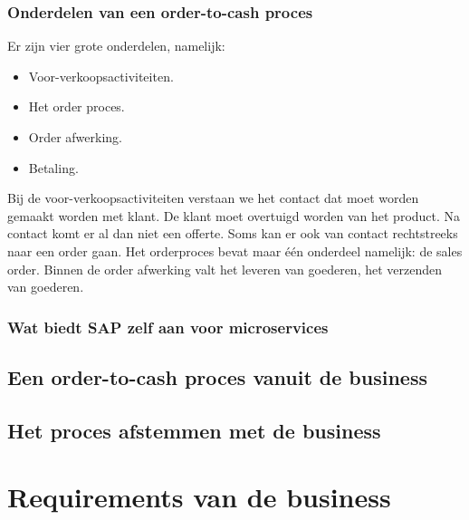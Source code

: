\subsubsection{Onderdelen van een order-to-cash proces}
Er zijn vier grote onderdelen, namelijk:
\begin{itemize}
	\item Voor-verkoopsactiviteiten.
	\item Het order proces.
	\item Order afwerking.
	\item Betaling.
\end{itemize}
Bij de voor-verkoopsactiviteiten verstaan we het contact dat moet worden gemaakt worden met klant. De klant moet overtuigd worden van het product. Na contact komt er al dan niet een offerte. Soms kan er ook van contact rechtstreeks naar een order gaan. 
Het orderproces bevat maar één onderdeel namelijk: de sales order. 
Binnen de order afwerking valt het leveren van goederen, het verzenden van goederen.
\subsubsection{Wat biedt SAP zelf aan voor microservices}
\subsection{Een order-to-cash proces vanuit de business}
\subsection{Het proces afstemmen met de business}

\section{Requirements van de business}

